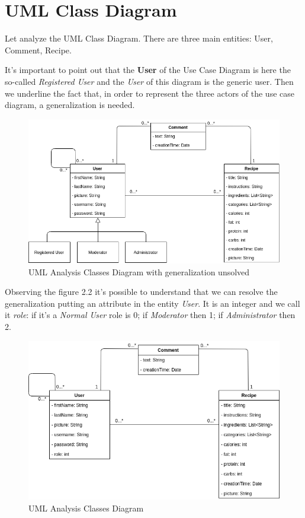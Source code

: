 \documentclass[a4paper]{report}
\begin{document}
\section{UML Class Diagram}
Let analyze the UML Class Diagram. There are three main entities: User, Comment, Recipe.

\noindent It's important to point out that the \textbf{User} of the Use Case Diagram is here the so-called \emph{Registered User} and the \emph{User} of this diagram is the generic user. Then we underline the fact that, in order to represent the three actors of the use case diagram, a generalization is needed.
 
\begin{figure}[htpb]
	\centering
	\includegraphics[scale=0.5]{img/ClassDiagram_generaliz.png}
	\caption{UML Analysis Classes Diagram with generalization unsolved}
\end{figure}

\noindent Observing the figure 2.2 it's possible to understand that we can resolve the generalization putting an attribute in the entity \emph{User}. It is an integer and we call it \emph{role}: if it's a \emph{Normal User} role is 0; if \emph{Moderator} then 1; if \emph{Administrator} then 2.

\begin{figure}[htpb]
	\centering
	\includegraphics[scale=0.5]{img/ClassDiagram.png}
	\caption{UML Analysis Classes Diagram}
\end{figure}
\end{document}
